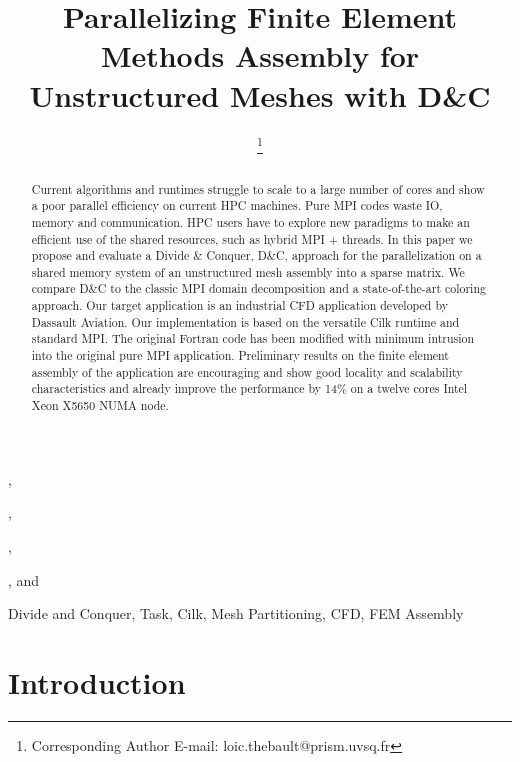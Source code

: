 \documentclass[10pt]{IOS-Book-Article}
\begin{document}
\begin{frontmatter}              %

\title{Parallelizing Finite Element Methods Assembly for Unstructured Meshes with D\&C}

\author[A]{ %
\thanks{Corresponding Author E-mail: loic.thebault@prism.uvsq.fr}},
\author[A]{ },
\author[D]{ },
\author[B]{ },
and
\author[A,D]{ }

\address[A]{PRISM - University of Versailles, France}
\address[B]{Dassault Aviation, Saint-Cloud, France}
\address[D]{Exascale Computing Research, France}

\begin{abstract}
Current algorithms and runtimes struggle to scale to a large number of cores and show a poor parallel efficiency on current HPC machines.
Pure MPI codes waste IO, memory and communication. HPC users have to explore new paradigms to make an efficient use of the shared resources,
such as hybrid MPI + threads.
In this paper we propose and evaluate a Divide \& Conquer, D\&C, approach for the parallelization  on a shared memory system of an unstructured mesh assembly into a sparse matrix. We compare D\&C to the classic MPI domain decomposition and a state-of-the-art coloring approach.
Our target application is an industrial CFD application developed by Dassault Aviation.
Our implementation is based on the versatile Cilk runtime and standard MPI.
The original Fortran code has been modified with minimum intrusion into the original pure MPI application.
Preliminary results on the finite element assembly of the application are encouraging and show good locality and scalability characteristics and already improve the performance by 14\% on a twelve cores   Intel Xeon X5650 NUMA node.
\end{abstract}

\begin{keyword}
Divide and Conquer, Task, Cilk, Mesh Partitioning, CFD, FEM Assembly
\end{keyword}
\end{frontmatter}

\thispagestyle{empty}
\pagestyle{empty}

\section{Introduction}
\end{document}
